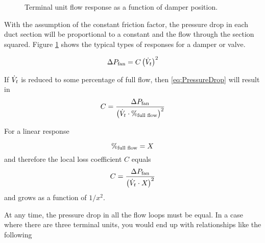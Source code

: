 \begin{figure}
\centering
{}
\caption{Terminal unit flow response as a function of damper position.}
\label{fig:flowVersusDamperPos}
\end{figure}



With the assumption of the constant friction factor, the pressure drop
in each duct section will be proportional to a constant and the flow
through the section squared. Figure \ref{fig:flowVersusDamperPos} shows
the typical types of responses for a damper or valve.

\begin{equation}\label{eq:PressureDrop}
    \Delta P_{\text{fan}} = C\left(\dot{V}_{t}\right)^2
\end{equation}

If \(\dot{V}_{t}\) is reduced to some percentage of full flow, then
 \ref{eq:PressureDrop} will result in
 \begin{equation}
     C = \frac{\Delta P_{\text{fan}}}{\left( \dot{V}_{t} \cdot \%_{\text{full flow}} \right)^2}
 \end{equation}
 
For a linear response

\begin{equation}
    \%_{\text{full flow}} = X_{}
\end{equation}
and therefore the local loss coefficient \(C\) equals
\begin{equation}
C = \frac{\Delta P_{\text{fan}}}{\left( \dot{V}_{t} \cdot X_{}  \right)^2}
\end{equation}
and grows as a function of \(1/x^2\). 

At any time, the pressure drop in all the flow loops must be equal. In a
case where there are three terminal units, you would end up with
relationships like the following

